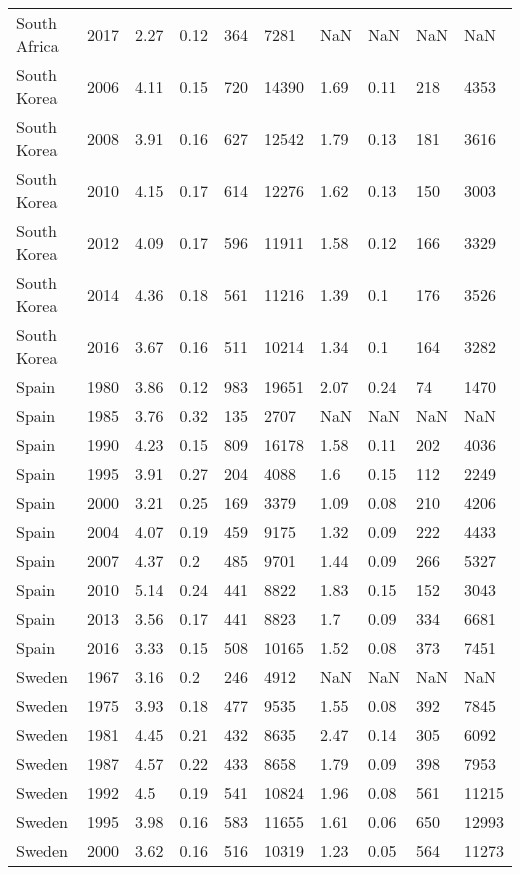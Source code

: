 \begin{tabular}{llllllllll}
South Africa & 2017 & 2.27 & 0.12 & 364 & 7281 & NaN & NaN & NaN & NaN \\ 
South Korea & 2006 & 4.11 & 0.15 & 720 & 14390 & 1.69 & 0.11 & 218 & 4353 \\ 
South Korea & 2008 & 3.91 & 0.16 & 627 & 12542 & 1.79 & 0.13 & 181 & 3616 \\ 
South Korea & 2010 & 4.15 & 0.17 & 614 & 12276 & 1.62 & 0.13 & 150 & 3003 \\ 
South Korea & 2012 & 4.09 & 0.17 & 596 & 11911 & 1.58 & 0.12 & 166 & 3329 \\ 
South Korea & 2014 & 4.36 & 0.18 & 561 & 11216 & 1.39 & 0.1 & 176 & 3526 \\ 
South Korea & 2016 & 3.67 & 0.16 & 511 & 10214 & 1.34 & 0.1 & 164 & 3282 \\ 
Spain & 1980 & 3.86 & 0.12 & 983 & 19651 & 2.07 & 0.24 & 74 & 1470 \\ 
Spain & 1985 & 3.76 & 0.32 & 135 & 2707 & NaN & NaN & NaN & NaN \\ 
Spain & 1990 & 4.23 & 0.15 & 809 & 16178 & 1.58 & 0.11 & 202 & 4036 \\ 
Spain & 1995 & 3.91 & 0.27 & 204 & 4088 & 1.6 & 0.15 & 112 & 2249 \\ 
Spain & 2000 & 3.21 & 0.25 & 169 & 3379 & 1.09 & 0.08 & 210 & 4206 \\ 
Spain & 2004 & 4.07 & 0.19 & 459 & 9175 & 1.32 & 0.09 & 222 & 4433 \\ 
Spain & 2007 & 4.37 & 0.2 & 485 & 9701 & 1.44 & 0.09 & 266 & 5327 \\ 
Spain & 2010 & 5.14 & 0.24 & 441 & 8822 & 1.83 & 0.15 & 152 & 3043 \\ 
Spain & 2013 & 3.56 & 0.17 & 441 & 8823 & 1.7 & 0.09 & 334 & 6681 \\ 
Spain & 2016 & 3.33 & 0.15 & 508 & 10165 & 1.52 & 0.08 & 373 & 7451 \\ 
Sweden & 1967 & 3.16 & 0.2 & 246 & 4912 & NaN & NaN & NaN & NaN \\ 
Sweden & 1975 & 3.93 & 0.18 & 477 & 9535 & 1.55 & 0.08 & 392 & 7845 \\ 
Sweden & 1981 & 4.45 & 0.21 & 432 & 8635 & 2.47 & 0.14 & 305 & 6092 \\ 
Sweden & 1987 & 4.57 & 0.22 & 433 & 8658 & 1.79 & 0.09 & 398 & 7953 \\ 
Sweden & 1992 & 4.5 & 0.19 & 541 & 10824 & 1.96 & 0.08 & 561 & 11215 \\ 
Sweden & 1995 & 3.98 & 0.16 & 583 & 11655 & 1.61 & 0.06 & 650 & 12993 \\ 
Sweden & 2000 & 3.62 & 0.16 & 516 & 10319 & 1.23 & 0.05 & 564 & 11273 \\ 

\end{tabular}
